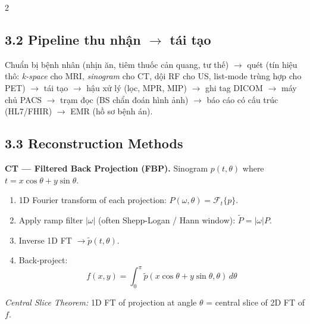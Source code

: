 \begin{paracol}{2}
\switchcolumn

\subsection*{3.2 Pipeline thu nhận $\to$ tái tạo}
Chuẩn bị bệnh nhân (nhịn ăn, tiêm thuốc cản quang, tư thế) $\to$ quét (tín hiệu thô: \emph{k-space} cho MRI, \emph{sinogram} cho CT, dội RF cho US, list-mode trùng hợp cho PET) $\to$ tái tạo $\to$ hậu xử lý (lọc, MPR, MIP) $\to$ ghi tag DICOM $\to$ máy chủ PACS $\to$ trạm đọc (BS chẩn đoán hình ảnh) $\to$ báo cáo có cấu trúc (HL7/FHIR) $\to$ EMR (hồ sơ bệnh án).

\medskip
\begin{center}
\end{center}

\switchcolumn*

\subsection*{3.3 Reconstruction Methods}
\textbf{CT — Filtered Back Projection (FBP).}
Sinogram $p(t,\theta)$ where $t=x\cos\theta+y\sin\theta$.
\begin{enumerate}[leftmargin=*,nosep]
  \item 1D Fourier transform of each projection: $P(\omega,\theta)=\mathcal F_t\{p\}$.
  \item Apply ramp filter $|\omega|$ (often Shepp-Logan / Hann window): $\tilde P=|\omega|P$.
  \item Inverse 1D FT $\to \tilde p(t,\theta)$.
  \item Back-project:
  $$f(x,y)=\int_0^\pi \tilde p(x\cos\theta + y\sin\theta,\theta)\,d\theta$$
\end{enumerate}
\emph{Central Slice Theorem:} 1D FT of projection at angle $\theta$ = central slice of 2D FT of $f$.


\end{paracol}
